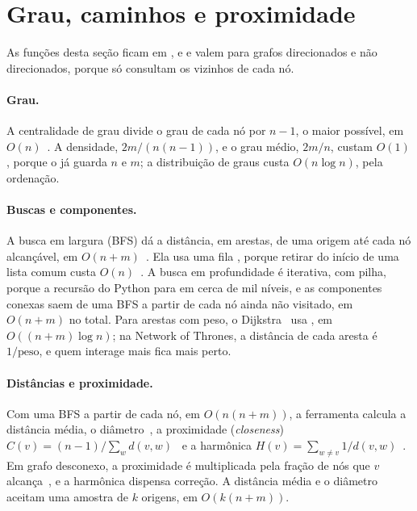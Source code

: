 \section{Grau, caminhos e proximidade}\label{sec:caminhos}

As funções desta seção ficam em ,  e
 e valem para grafos direcionados e não direcionados, porque só
consultam os vizinhos de cada nó.

\paragraph{Grau.} A centralidade de grau divide o grau de cada nó por $n-1$, o maior possível, em
$O(n)$~\cite{wasserman1994}. A densidade, $2m/(n(n-1))$, e o grau médio, $2m/n$, custam $O(1)$,
porque o  já guarda $n$ e $m$; a distribuição de graus custa $O(n \log n)$, pela
ordenação.

\paragraph{Buscas e componentes.} A busca em largura (BFS) dá a distância, em arestas, de uma origem
até cada nó alcançável, em $O(n+m)$~\cite{cormen2022}. Ela usa uma fila , porque retirar
do início de uma lista comum custa $O(n)$~\cite{pythoncomplexidade}. A busca em profundidade é
iterativa, com pilha, porque a recursão do Python para em cerca de mil níveis, e as componentes
conexas saem de uma BFS a partir de cada nó ainda não visitado, em $O(n+m)$ no total. Para arestas
com peso, o Dijkstra~\cite{dijkstra1959} usa , em $O((n+m)\log n)$; na Network of
Thrones, a distância de cada aresta é $1/\text{peso}$, e quem interage mais fica mais perto.

\paragraph{Distâncias e proximidade.} Com uma BFS a partir de cada nó, em $O(n(n+m))$, a ferramenta
calcula a distância média, o diâmetro~\cite{newman2018}, a proximidade (\emph{closeness})
$C(v) = (n-1)/\sum_{w} d(v,w)$~\cite{bavelas1950} e a harmônica
$H(v) = \sum_{w \neq v} 1/d(v,w)$~\cite{boldi2014}. Em grafo desconexo, a proximidade é multiplicada
pela fração de nós que $v$ alcança~\cite{wasserman1994}, e a harmônica dispensa correção. A
distância média e o diâmetro aceitam uma amostra de $k$ origens, em $O(k(n+m))$.

